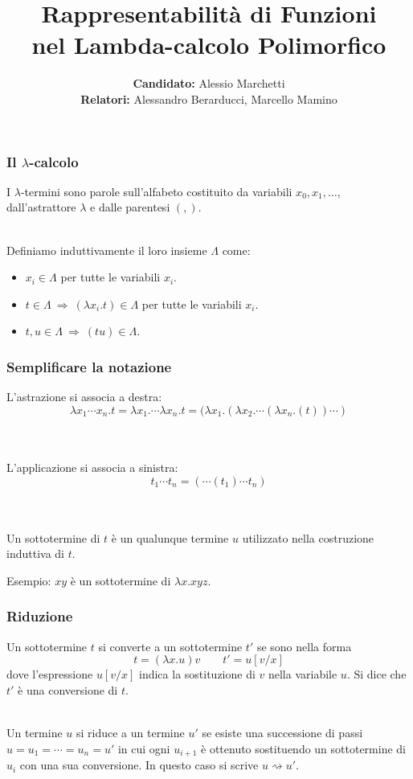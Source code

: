 \documentclass[aspectratio=43]{beamer}
\title[Lambda-calcolo Polimorfico]{Rappresentabilit\`a di Funzioni \\nel Lambda-calcolo
    Polimorfico}
\author[Alessio Marchetti]{\textbf{Candidato:} Alessio Marchetti \\ \textbf{Relatori:} Alessandro
Berarducci, Marcello Mamino}
\date{}
\newcommand{\conv}{\rightsquigarrow}
\begin{document}
\frame{\titlepage}

\begin{frame}
    \frametitle{Il $\lambda$-calcolo} I $\lambda$-termini sono parole
    sull'alfabeto costituito da variabili $x_0, x_1, \dots$, dall'astrattore
    $\lambda$ e dalle parentesi $(,)$. 
\\~\

    Definiamo induttivamente il loro insieme $\Lambda$ come:
    \begin{itemize}
        \item $x_i \in \Lambda$ per tutte le variabili $x_i$.
        \item $t\in \Lambda\ \Rightarrow\ (\lambda x_i.t)\in\Lambda$ per tutte
            le variabili $x_i$.
        \item $t,u\in \Lambda\ \Rightarrow\ (tu)\in \Lambda$.
    \end{itemize}
\end{frame}

\begin{frame}
    \frametitle{Semplificare la notazione}
    L'astrazione si associa a destra:
    \[
        \lambda x_1\cdots x_n.t = \lambda x_1. \cdots \lambda x_n.t = (\lambda
        x_1.(\lambda x_2.\cdots (\lambda x_n.(t))\cdots)
    \]
    \\~\

    L'applicazione si associa a sinistra:
    \[
        t_1\cdots t_n = (\cdots(t_1)\cdots t_n) 
    \]
    \\~\
    
    Un sottotermine di $t$ \`e un qualunque termine $u$ utilizzato nella
    costruzione induttiva di $t$. 

    Esempio: $xy$ \`e un sottotermine di $\lambda x. xyz$.
\end{frame}

\begin{frame}
    \frametitle{Riduzione}
    Un sottotermine $t$ si converte a un sottotermine $t'$ se sono nella forma
    \[
        t = (\lambda x. u)v \qquad t' = u[v/x]
    \]
    dove l'espressione $u[v/x]$ indica la sostituzione di $v$ nella variabile
    $u$. Si dice che $t'$ \`e una conversione di $t$.
    \\~\

    Un termine $u$ si riduce a un termine $u'$ se esiste una successione di
    passi $u = u_1 = \cdots = u_n = u'$ in cui ogni $u_{i+1}$ \`e ottenuto
    sostituendo un sottotermine di $u_i$ con una sua conversione. In questo caso
    si scrive $u \conv u'$.
\end{frame}
\end{document}

